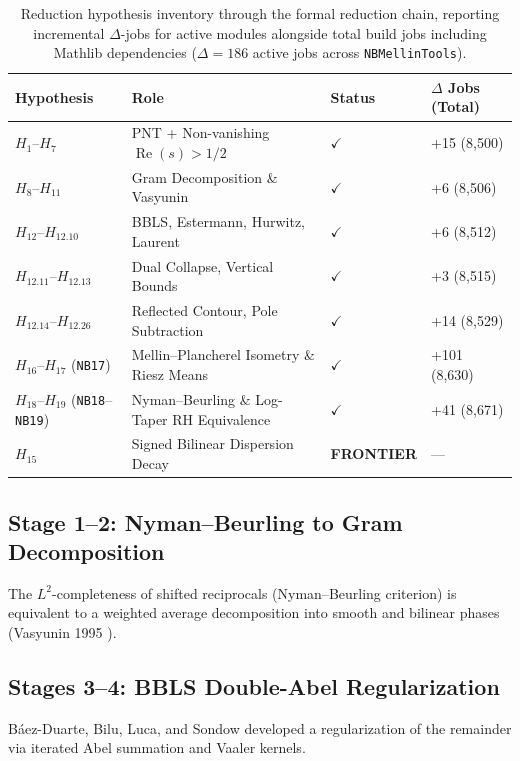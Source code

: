 \documentclass[11pt,a4paper]{article}
\theoremstyle{plain}
\theoremstyle{definition}
\theoremstyle{remark}
\DeclareMathOperator{\RePart}{Re}
\renewcommand{\Re}{\RePart}
\begin{document}
\begin{table}[htbp]
\centering
\small
\begin{tabular}{llll}
\toprule
\textbf{Hypothesis} & \textbf{Role} & \textbf{Status} & \textbf{$\Delta$ Jobs (Total)} \\
\midrule
$H_1$--$H_7$ & PNT + Non-vanishing $\Re(s) > 1/2$ & $\checkmark$ & +15 (8,500) \\
$H_8$--$H_{11}$ & Gram Decomposition \& Vasyunin & $\checkmark$ & +6 (8,506) \\
$H_{12}$--$H_{12.10}$ & BBLS, Estermann, Hurwitz, Laurent & $\checkmark$ & +6 (8,512) \\
$H_{12.11}$--$H_{12.13}$ & Dual Collapse, Vertical Bounds & $\checkmark$ & +3 (8,515) \\
$H_{12.14}$--$H_{12.26}$ & Reflected Contour, Pole Subtraction & $\checkmark$ & +14 (8,529) \\
$H_{16}$--$H_{17}$ (\texttt{NB17}) & Mellin--Plancherel Isometry \& Riesz Means & $\checkmark$ & +101 (8,630) \\
$H_{18}$--$H_{19}$ (\texttt{NB18}--\texttt{NB19}) & Nyman--Beurling \& Log-Taper RH Equivalence & $\checkmark$ & +41 (8,671) \\
\midrule
$H_{15}$ & Signed Bilinear Dispersion Decay & \textbf{FRONTIER} & --- \\
\bottomrule
\end{tabular}
\caption{Reduction hypothesis inventory through the formal reduction chain, reporting incremental $\Delta$-jobs for active modules alongside total build jobs including Mathlib dependencies ($\Delta = 186$ active jobs across \texttt{NBMellinTools}).}
\label{tab:h_inventory}
\end{table}

\subsection{Stage 1--2: Nyman--Beurling to Gram Decomposition}

The $L^2$-completeness of shifted reciprocals (Nyman--Beurling criterion) is equivalent to a weighted average decomposition into smooth and bilinear phases (Vasyunin 1995 \cite{Vasyunin1995}).

\subsection{Stages 3--4: BBLS Double-Abel Regularization}

Báez-Duarte, Bilu, Luca, and Sondow developed a regularization of the remainder via iterated Abel summation and Vaaler kernels.
\end{document}
